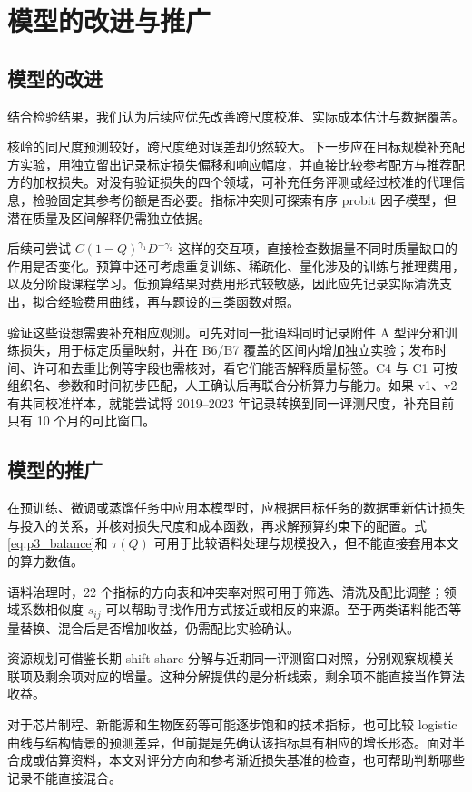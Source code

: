 \section{模型的改进与推广}

\subsection{模型的改进}

结合检验结果，我们认为后续应优先改善跨尺度校准、实际成本估计与数据覆盖。

核岭的同尺度预测较好，跨尺度绝对误差却仍然较大。下一步应在目标规模补充配方实验，用独立留出记录标定损失偏移和响应幅度，并直接比较参考配方与推荐配方的加权损失。对没有验证损失的四个领域，可补充任务评测或经过校准的代理信息，检验固定其参考份额是否必要。指标冲突则可探索有序 probit 因子模型，但潜在质量及区间解释仍需独立依据。

后续可尝试 $C(1-Q)^{\gamma_1}D^{-\gamma_2}$ 这样的交互项，直接检查数据量不同时质量缺口的作用是否变化。预算中还可考虑重复训练、稀疏化、量化涉及的训练与推理费用，以及分阶段课程学习。低预算结果对费用形式较敏感，因此应先记录实际清洗支出，拟合经验费用曲线，再与题设的三类函数对照。

验证这些设想需要补充相应观测。可先对同一批语料同时记录附件 A 型评分和训练损失，用于标定质量映射，并在 B6/B7 覆盖的区间内增加独立实验；发布时间、许可和去重比例等字段也需核对，看它们能否解释质量标签。C4 与 C1 可按组织名、参数和时间初步匹配，人工确认后再联合分析算力与能力。如果 v1、v2 有共同校准样本，就能尝试将 2019--2023 年记录转换到同一评测尺度，补充目前只有 10 个月的可比窗口。

\subsection{模型的推广}

在预训练、微调或蒸馏任务中应用本模型时，应根据目标任务的数据重新估计损失与投入的关系，并核对损失尺度和成本函数，再求解预算约束下的配置。式\eqref{eq:p3_balance}和 $\tau(Q)$ 可用于比较语料处理与规模投入，但不能直接套用本文的算力数值。

语料治理时，22 个指标的方向表和冲突率对照可用于筛选、清洗及配比调整；领域系数相似度 $s_{ij}$ 可以帮助寻找作用方式接近或相反的来源。至于两类语料能否等量替换、混合后是否增加收益，仍需配比实验确认。

资源规划可借鉴长期 shift-share 分解与近期同一评测窗口对照，分别观察规模关联项及剩余项对应的增量。这种分解提供的是分析线索，剩余项不能直接当作算法收益。

对于芯片制程、新能源和生物医药等可能逐步饱和的技术指标，也可比较 logistic 曲线与结构情景的预测差异，但前提是先确认该指标具有相应的增长形态。面对半合成或估算资料，本文对评分方向和参考渐近损失基准的检查，也可帮助判断哪些记录不能直接混合。
